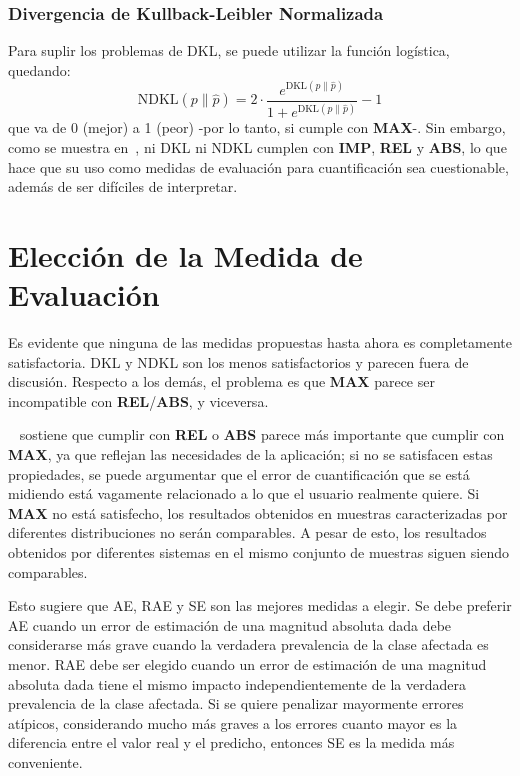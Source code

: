 \subsubsection{Divergencia de Kullback-Leibler
Normalizada}\label{evaluacion:ndkl}

Para suplir los problemas de DKL, se puede utilizar la función logística,
quedando:
\begin{equation}
    {\text{NDKL}}(p\parallel \hat{p}) = 2 \cdot \frac{e^{{\text{DKL}}(p\parallel \hat{p})}}{1+e^{{\text{DKL}}(p\parallel \hat{p})}}-1\label{evaluacion:eq_ndkl}
\end{equation}
que va de {0} (mejor) a {1} (peor) -por lo tanto, si cumple con {\bf MAX}-. Sin
embargo, como se muestra en~\cite{sebastiani2020evaluation}, ni DKL ni NDKL
cumplen con {\bf IMP}, {\bf REL} y {\bf ABS}, lo que hace que su uso como
medidas de evaluación para cuantificación sea cuestionable, además de ser
difíciles de interpretar.

\section{Elección de la Medida de Evaluación}\label{evaluacion:eleccion}

Es evidente que ninguna de las medidas propuestas hasta ahora es completamente
satisfactoria. DKL y NDKL son los menos satisfactorios y parecen fuera de
discusión. Respecto a los demás, el problema es que {\bf MAX} parece ser
incompatible con {\bf REL}/{\bf ABS}, y viceversa.

~\citet{sebastiani2020evaluation} sostiene que cumplir con {\bf REL} o {\bf ABS}
parece más importante que cumplir con {\bf MAX}, ya que reflejan las necesidades
de la aplicación; si no se satisfacen estas propiedades, se puede argumentar que
el error de cuantificación que se está midiendo está vagamente relacionado a lo
que el usuario realmente quiere. Si {\bf MAX} no está satisfecho, los resultados
obtenidos en muestras caracterizadas por diferentes distribuciones no serán
comparables. A pesar de esto, los resultados obtenidos por diferentes sistemas
en el mismo conjunto de muestras siguen siendo comparables.

Esto sugiere que AE, RAE y SE son las mejores medidas a elegir. Se debe preferir
AE cuando un error de estimación de una magnitud absoluta dada debe considerarse
más grave cuando la verdadera prevalencia de la clase afectada es menor. RAE
debe ser elegido cuando un error de estimación de una magnitud absoluta dada
tiene el mismo impacto independientemente de la verdadera prevalencia de la
clase afectada. Si se quiere penalizar mayormente errores atípicos, considerando
mucho más graves a los errores cuanto mayor es la diferencia entre el valor real
y el predicho, entonces SE es la medida más conveniente.

